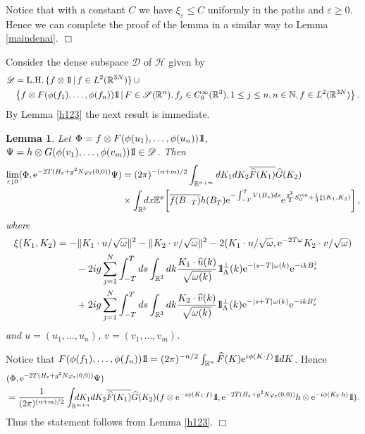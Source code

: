 \documentclass[11pt]{article}
\newtheorem{lemma}[theorem]{Lemma}
\newcommand{\bl}[1]{\begin{lemma}\label{#1}}
\newcommand{\el}{\end{lemma}}
\def\bbbone{{\mathchoice {\rm 1\mskip-4mu l} {\rm 1\mskip-4mu l}
{\rm 1\mskip-4.5mu l} {\rm 1\mskip-5mu l}}}
\def\one{\bbbone}
\newcommand{\kp}{\one_\Lambda^\perp(k)}
\providecommand{\idx}{\int_{\BR} \!\!\! dx}
\newcommand{\Ebb}{{\mathbb E}}
\providecommand{\qed}{\hfill {$\Box$}\par\medskip}
\providecommand{\BR}{{\mathbb{R}^3 }}
\providecommand{\BRN}{{\mathbb{R}^{3N} }}
\providecommand{\RR}{\mathbb{R}}
\providecommand{\LRN}{{L^2(\BRN)}}
\providecommand{\D}{{\ms D}}
\providecommand{\hn}{H}%
\providecommand{\ms}[1]{\mathscr{#1}}
\providecommand{\lkk}{\left\{}
\providecommand{\rkk}{\right\}}
\providecommand{\ov}[1]{\overline{#1}}
\providecommand{\hhh}{\ms H} %
\providecommand{\non}{\nonumber}
\providecommand{\e}{{\rm e}}
\providecommand{\1}{\mathbb{1}}
\providecommand {\D}  {\ensuremath {\mathcal{D}}}
\providecommand{\eps}{\varepsilon}
\providecommand{\ren}{{\rm ren}}
\newcounter {constant}
\begin{document}
Notice that with a constant $C$ we have $\xi_\eps\leq C$ uniformly in the paths and $\eps\geq0$. Hence
we can complete the proof of the lemma in a similar way to Lemma \ref{maindenai}.
\qed
Consider the dense subspace  $\D$ of  $\hhh$ given by
\begin{eqnarray*}
\lefteqn{
\D={\rm L.H.}\, \{f\otimes \one \,|\, f\in\LRN\} \, \cup } \\
&&
\lkk f\otimes F(\phi(f_1),\ldots,\phi(f_n)) \one\,|\, F\in \ms S(\RR^n),
f_j\in C_0^\infty(\BR), 1\leq j\leq n, n\in \Bbb N, f\in\LRN \rkk.
\end{eqnarray*}
By Lemma \ref{h123} the next result is immediate.
\bl{h2}
Let $\Phi=f\otimes F(\phi(u_1),\ldots,\phi(u_n))\one$, $\Psi=h\otimes G(\phi(v_1),\ldots,\phi(v_m))\one \in \D$.
Then
\begin{align}
\lim_{\eps\downarrow0}
(\Phi, \e^{-2T (\hn_\eps+g^2 N\varphi_\eps(0,0))} \Psi)
&=
(2\pi)^{-(n+m)/2} \int_{\RR^{n+m}}dK_1 dK_2 \ov{\widehat F(K_1)} \widehat G(K_2) \non \\
& \times
\idx  \Ebb^x\!\left[\ov{f(B_{-T})} h(B_T) \e^{-\int_{-T}^T V(B_s) ds} \e^{\frac{g^2}{2}
S_0^\ren + \frac{1}{4} \xi(K_1,K_2)} \right],
\label{310}
\end{align}
where
\begin{align*}
\xi(K_1,K_2)
&=
-\|K_1\cdot u/\sqrt\omega\|^2 -\|K_2\cdot v /\sqrt\omega\|^2 -
2 (K_1 \cdot u/\sqrt\omega, \e^{-2T\omega} K_2 \cdot v/\sqrt\omega)\\
& \qquad
- 2i g \sum_{j=1}^N \int_{-T}^Tds \int_\BR dk
\frac{K_1\cdot \widehat u(k)}{\sqrt{\omega(k)}}\kp \e^{-|s-T|\omega(k)}\e^{-ikB_s^j} \\
&
\qquad + 2i g \sum_{j=1}^N \int_{-T}^Tds \int_\BR dk
\frac{K_2\cdot \widehat v(k)}{\sqrt{\omega(k)}}\kp \e^{-|s+T|\omega(k)}\e^{-ikB_s^j}
\end{align*}
and $u=(u_1,...,u_n)$, $v=(v_1,...,v_m)$.
\el
\proof
Notice that $F(\phi(f_1),\ldots,\phi(f_n)) \one
=(2\pi)^{-n/2} \int_{\RR^n} \widehat F(K)
\e^{i\phi (K\cdot f)} \one dK$. Hence
\begin{align*}
& (\Phi, \e^{-2T(\hn_\eps+g^2 N \varphi_\eps(0,0))} \Psi)\\
&= \frac{1}{(2\pi)^{(n+m)/2}}
\int_{\RR^{m+n}}
\!\!\!
\!\!\!
\!\!\!
\!\!\!
dK_1dK_2\ov{\widehat F(K_1)} \widehat G(K_2)
(f\otimes \e^{-i\phi(K_1\cdot f)}\one,
\e^{-2T(\hn_\eps+g^2 N \varphi_\eps(0,0))}
h\otimes \e^{-i\phi(K_2\cdot h)}\one).
\end{align*}
Thus the statement follows from Lemma \ref{h123}.
\qed
\end{document}
